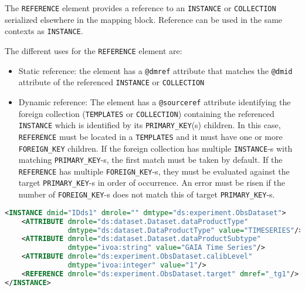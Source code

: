 The \texttt{REFERENCE} element provides a reference to an \texttt{INSTANCE} or \texttt{COLLECTION} serialized 
elsewhere in the mapping block.
Reference can be used in the same contexts as \texttt{INSTANCE}.

The different uses for the \texttt{REFERENCE} element are:

\begin{itemize}
    \item Static reference: the element has a \texttt{@dmref} attribute that matches the \texttt{@dmid} 
          attribute of the referenced \texttt{INSTANCE} or \texttt{COLLECTION} 
    \item Dynamic reference: The element has a \texttt{@sourceref} attribute identifying the foreign 
          collection (\texttt{TEMPLATES} or \texttt{COLLECTION}) containing the referenced \texttt{INSTANCE}
          which is identified by its \texttt{PRIMARY\_KEY}(s) children. 
          In this case, \texttt{REFERENCE} must be located in a \texttt{TEMPLATES} and it must have one 
          or more \texttt{FOREIGN\_KEY} children. 
          If the foreign collection has multiple \texttt{INSTANCE}-s with matching \texttt{PRIMARY\_KEY}-s, 
          the first match must be taken by default.
          If the \texttt{REFERENCE} has multiple \texttt{FOREIGN\_KEY}-s, they must be evaluated 
          against the target \texttt{PRIMARY\_KEY}-s in order of occurrence.
          An error must be risen if the number of \texttt{FOREIGN\_KEY}-s does not match this of target 
          \texttt{PRIMARY\_KEY}-s.
\end{itemize}

\begin{lstlisting}[caption={Simple \texttt{REFERENCE}, to be replaced with the \texttt{INSTANCE} having \texttt{@dmid=\_tg1} (see line~\ref{REFERENCE_snippet_1} in Appendix~\ref{appendix_A}).},language=XML]
<INSTANCE dmid="IDds1" dmrole="" dmtype="ds:experiment.ObsDataset">
    <ATTRIBUTE dmrole="ds:dataset.Dataset.dataProductType" 
               dmtype="ds:dataset.DataProductType" value="TIMESERIES"/>
    <ATTRIBUTE dmrole="ds:dataset.Dataset.dataProductSubtype" 
               dmtype="ivoa:string" value="GAIA Time Series"/>
    <ATTRIBUTE dmrole="ds:experiment.ObsDataset.calibLevel" 
               dmtype="ivoa:integer" value="1"/>
    <REFERENCE dmrole="ds:experiment.ObsDataset.target" dmref="_tg1"/>
</INSTANCE>

\end{lstlisting}

